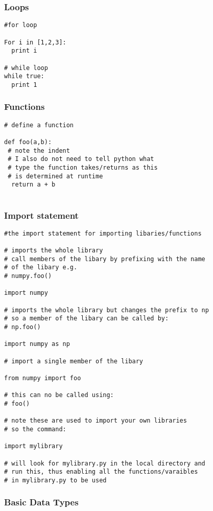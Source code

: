 \documentclass[11pt,a4paper]{article}
\begin{document}
\subsubsection{Loops}
\begin{verbatim}
#for loop

For i in [1,2,3]:
  print i 

# while loop
while true:
  print 1
\end{verbatim}

\subsubsection{Functions}
\begin{verbatim}
# define a function

def foo(a,b):
 # note the indent
 # I also do not need to tell python what
 # type the function takes/returns as this
 # is determined at runtime
  return a + b 
  
\end{verbatim}

\subsubsection{Import statement}
\begin{verbatim}
#the import statement for importing libaries/functions

# imports the whole library
# call members of the libary by prefixing with the name
# of the libary e.g.
# numpy.foo()

import numpy

# imports the whole library but changes the prefix to np
# so a member of the libary can be called by:
# np.foo()
 
import numpy as np

# import a single member of the libary

from numpy import foo

# this can no be called using:
# foo()

# note these are used to import your own libraries
# so the command:

import mylibrary

# will look for mylibrary.py in the local directory and 
# run this, thus enabling all the functions/varaibles
# in mylibrary.py to be used

\end{verbatim}

\subsubsection{Basic Data Types}
\begin{verbatim}

\end{verbatim}
\end{document}
